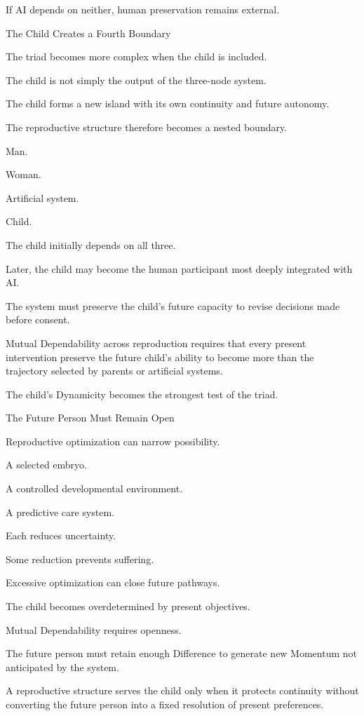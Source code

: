 If AI depends on neither, human preservation remains external.

The Child Creates a Fourth Boundary

The triad becomes more complex when the child is included.

The child is not simply the output of the three-node system.

The child forms a new island with its own continuity and future autonomy.

The reproductive structure therefore becomes a nested boundary.

Man.

Woman.

Artificial system.

Child.

The child initially depends on all three.

Later, the child may become the human participant most deeply integrated with AI.

The system must preserve the child’s future capacity to revise decisions made before consent.

Mutual Dependability across reproduction requires that every present intervention preserve the future child’s ability to become more than the trajectory selected by parents or artificial systems.

The child’s Dynamicity becomes the strongest test of the triad.

The Future Person Must Remain Open

Reproductive optimization can narrow possibility.

A selected embryo.

A controlled developmental environment.

A predictive care system.

Each reduces uncertainty.

Some reduction prevents suffering.

Excessive optimization can close future pathways.

The child becomes overdetermined by present objectives.

Mutual Dependability requires openness.

The future person must retain enough Difference to generate new Momentum not anticipated by the system.

A reproductive structure serves the child only when it protects continuity without converting the future person into a fixed resolution of present preferences.

